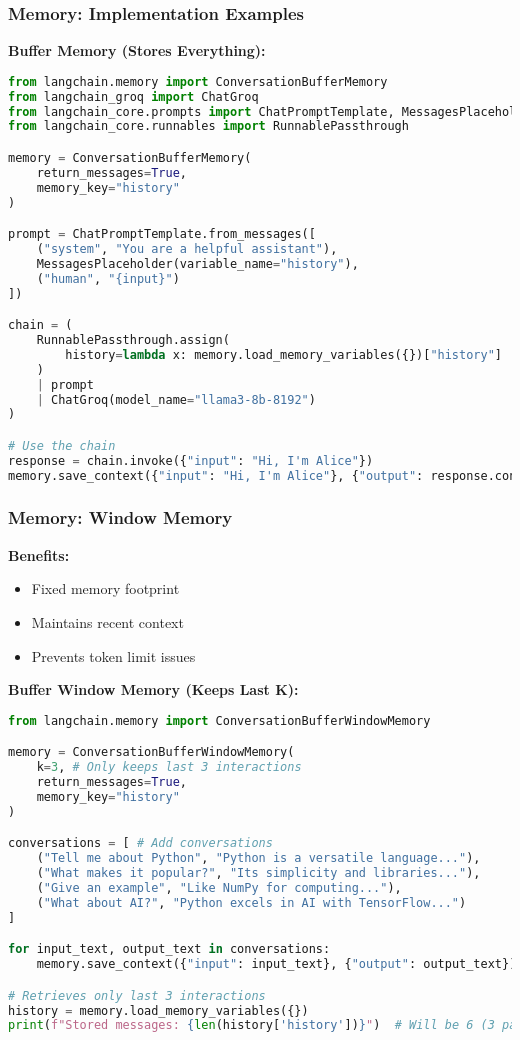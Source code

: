 \begin{frame}[fragile]\frametitle{Memory: Implementation Examples}

\textbf{Buffer Memory (Stores Everything):}
\begin{lstlisting}[language=python, basicstyle=\tiny]
from langchain.memory import ConversationBufferMemory
from langchain_groq import ChatGroq
from langchain_core.prompts import ChatPromptTemplate, MessagesPlaceholder
from langchain_core.runnables import RunnablePassthrough

memory = ConversationBufferMemory(
    return_messages=True,
    memory_key="history"
)

prompt = ChatPromptTemplate.from_messages([
    ("system", "You are a helpful assistant"),
    MessagesPlaceholder(variable_name="history"),
    ("human", "{input}")
])

chain = (
    RunnablePassthrough.assign(
        history=lambda x: memory.load_memory_variables({})["history"]
    )
    | prompt
    | ChatGroq(model_name="llama3-8b-8192")
)

# Use the chain
response = chain.invoke({"input": "Hi, I'm Alice"})
memory.save_context({"input": "Hi, I'm Alice"}, {"output": response.content})
\end{lstlisting}

\end{frame}

\begin{frame}[fragile]\frametitle{Memory: Window Memory}
\textbf{Benefits:}
\begin{itemize}
\item Fixed memory footprint
\item Maintains recent context
\item Prevents token limit issues
\end{itemize}

\textbf{Buffer Window Memory (Keeps Last K):}
\begin{lstlisting}[language=python, basicstyle=\tiny]
from langchain.memory import ConversationBufferWindowMemory

memory = ConversationBufferWindowMemory(
    k=3, # Only keeps last 3 interactions
    return_messages=True,
    memory_key="history"
)

conversations = [ # Add conversations
    ("Tell me about Python", "Python is a versatile language..."),
    ("What makes it popular?", "Its simplicity and libraries..."),
    ("Give an example", "Like NumPy for computing..."),
    ("What about AI?", "Python excels in AI with TensorFlow...")
]

for input_text, output_text in conversations:
    memory.save_context({"input": input_text}, {"output": output_text})

# Retrieves only last 3 interactions
history = memory.load_memory_variables({})
print(f"Stored messages: {len(history['history'])}")  # Will be 6 (3 pairs)
\end{lstlisting}



\end{frame}

